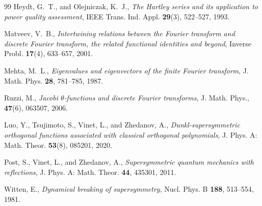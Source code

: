 \documentclass[12 pt]{amsart}
\numberwithin{equation}{section}
\begin{document}
\begin{thebibliography}{99}
Heydt, G.~T., and Olejniczak, K.~J.,
\textit{The Hartley series and its application to power quality assessment},
IEEE Trans. Ind. Appl. \textbf{29}(3), 522--527, 1993.

Matveev, V.~B.,
\textit{Intertwining relations between the Fourier transform and discrete Fourier transform, the related functional identities and beyond},
Inverse Probl. \textbf{17}(4), 633--657, 2001.

Mehta, M.~L.,
\textit{Eigenvalues and eigenvectors of the finite Fourier transform},
J. Math. Phys. \textbf{28}, 781--785, 1987.

Ruzzi, M.,
\textit{Jacobi $\theta$-functions and discrete Fourier transforms},
J. Math. Phys., \textbf{47}(6), 063507, 2006.

Luo, Y., Tsujimoto, S., Vinet, L., and Zhedanov, A.,
\textit{Dunkl-supersymmetric orthogonal functions associated with classical orthogonal polynomials},
J. Phys. A: Math. Theor. \textbf{53}(8), 085201, 2020.


Post, S., Vinet, L., and Zhedanov, A.,
\textit{Supersymmetric quantum mechanics with reflections},
J. Phys. A: Math. Theor. \textbf{44}, 435301, 2011.

Witten, E.,
\textit{Dynamical breaking of supersymmetry},
Nucl. Phys. B \textbf{188}, 513--554, 1981.

\end{thebibliography}
\end{document}
